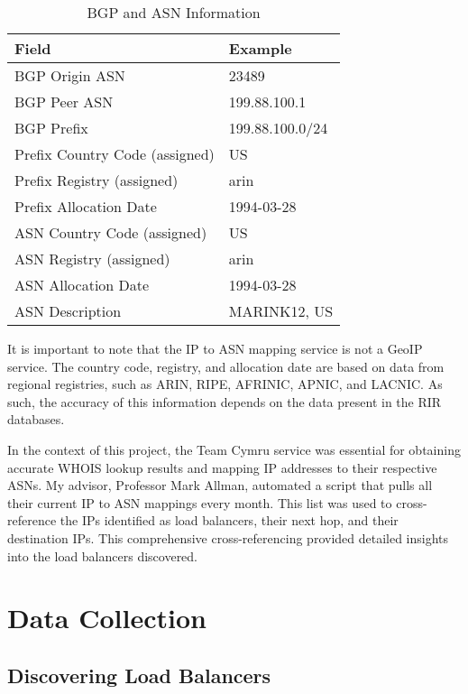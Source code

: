 \documentclass[12pt]{cwru_thesis}
\begin{document}
\begin{table}[h]
    \centering
    \begin{tabular}{|l|l|}
        \hline
        \textbf{Field} & \textbf{Example} \\
        \hline
        BGP Origin ASN & 23489 \\
        \hline
        BGP Peer ASN & 199.88.100.1 \\
        \hline
        BGP Prefix & 199.88.100.0/24 \\
        \hline
        Prefix Country Code (assigned) & US \\
        \hline
        Prefix Registry (assigned) & arin \\
        \hline
        Prefix Allocation Date & 1994-03-28 \\
        \hline
        ASN Country Code (assigned) & US \\
        \hline
        ASN Registry (assigned) & arin \\
        \hline
        ASN Allocation Date & 1994-03-28 \\
        \hline
        ASN Description & MARINK12, US \\
        \hline
    \end{tabular}
    \caption{BGP and ASN Information}
    \label{tab:bgp_asn_info}
\end{table}

It is important to note that the IP to ASN mapping service is not a GeoIP service. The country code, registry, and allocation date are based on data from regional registries, such as ARIN, RIPE, AFRINIC, APNIC, and LACNIC. As such, the accuracy of this information depends on the data present in the RIR databases.

In the context of this project, the Team Cymru service was essential for obtaining accurate WHOIS lookup results and mapping IP addresses to their respective ASNs. My advisor, Professor Mark Allman, automated a script that pulls all their current IP to ASN mappings every month. This list was used to cross-reference the IPs identified as load balancers, their next hop, and their destination IPs. This comprehensive cross-referencing provided detailed insights into the load balancers discovered. 




\chapter{Data Collection}
\section{Discovering Load Balancers}
\end{document}
